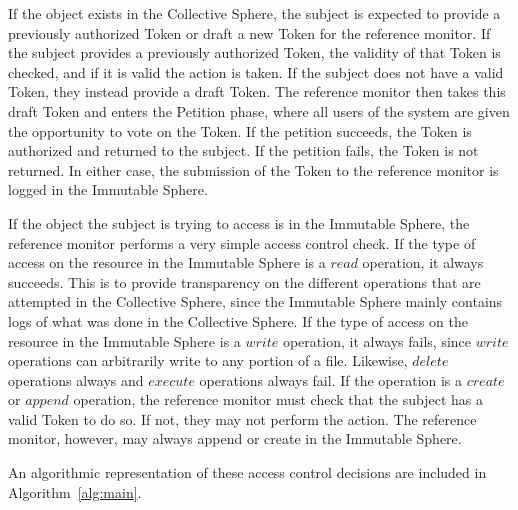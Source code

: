 If the object exists in the Collective Sphere, the subject is expected to
provide a previously authorized Token or draft a new Token for the reference
monitor. If the subject provides a previously authorized Token, the validity of
that Token is checked, and if it is valid the action is taken. If
the subject does not have a valid Token, they instead provide a draft Token. The
reference monitor then takes this draft Token and enters the Petition phase,
where all users of the system are given the opportunity to vote on the Token. If
the petition succeeds, the Token is authorized and returned to the subject. If
the petition fails, the Token is not returned. In either case, the submission of
the Token to the reference monitor is logged in the Immutable Sphere.

If the object the subject is trying to access is in the Immutable Sphere, the
reference monitor performs a very simple access control check. If the type of
access on the resource in the Immutable Sphere is a $read$ operation, it always
succeeds. This
is to provide transparency on the different operations that are attempted in
the Collective Sphere, since the Immutable Sphere mainly contains logs of what
was done in the Collective Sphere. If the type of access on the resource in the
Immutable Sphere is a $write$ operation, it always fails, since $write$
operations can arbitrarily write to any portion of a file. Likewise, $delete$
operations always and $execute$ operations always fail. If the operation is a
$create$ or $append$ operation, the reference monitor must check that the
subject has a valid Token to do so. If not, they may not perform the action.
The reference monitor, however, may always append or create in the Immutable
Sphere.

An algorithmic representation of these access control decisions are included in
Algorithm~\ref{alg:main}.

